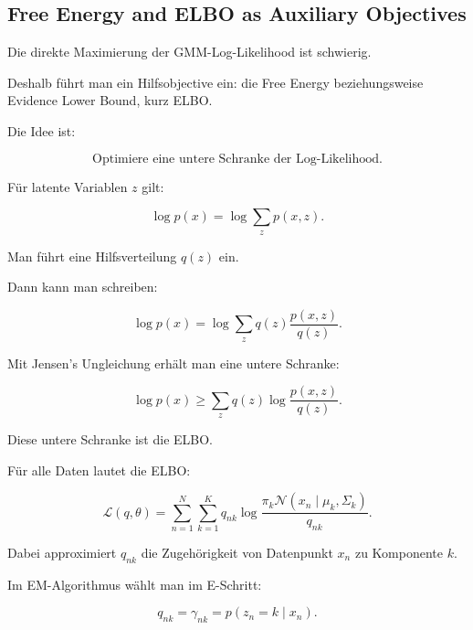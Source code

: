 \documentclass[11pt,a4paper]{scrartcl}
\begin{document}
\subsection{Free Energy and ELBO as Auxiliary Objectives}

\begin{notebox}
    Die direkte Maximierung der GMM-Log-Likelihood ist schwierig.

    Deshalb führt man ein Hilfsobjective ein: die Free Energy beziehungsweise
    Evidence Lower Bound, kurz ELBO.

    Die Idee ist:

    \[
        \text{Optimiere eine untere Schranke der Log-Likelihood.}
    \]
\end{notebox}

\begin{solutionbox}
    Für latente Variablen \(z\) gilt:

    \[
        \log p(x)
        =
        \log
        \sum_z
        p(x,z).
    \]

    Man führt eine Hilfsverteilung \(q(z)\) ein.

    Dann kann man schreiben:

    \[
        \log p(x)
        =
        \log
        \sum_z
        q(z)
        \frac{p(x,z)}{q(z)}.
    \]

    Mit Jensen's Ungleichung erhält man eine untere Schranke:

    \[
        \log p(x)
        \geq
        \sum_z
        q(z)
        \log
        \frac{p(x,z)}{q(z)}.
    \]

    Diese untere Schranke ist die ELBO.
\end{solutionbox}

\begin{calculationbox}
    Für alle Daten lautet die ELBO:

    \[
        \mathcal{L}(q,\theta)
        =
        \sum_{n=1}^{N}
        \sum_{k=1}^{K}
        q_{nk}
        \log
        \frac{
            \pi_k
            \mathcal{N}(x_n\mid \mu_k,\Sigma_k)
        }{
            q_{nk}
        }.
    \]

    Dabei approximiert \(q_{nk}\) die Zugehörigkeit von Datenpunkt \(x_n\) zu
    Komponente \(k\).

    Im EM-Algorithmus wählt man im E-Schritt:

    \[
        q_{nk}
        =
        \gamma_{nk}
        =
        p(z_n=k\mid x_n).
    \]
\end{calculationbox}
\end{document}
